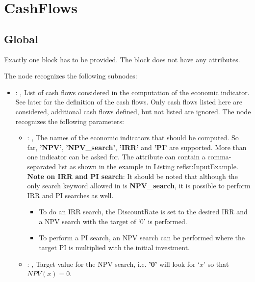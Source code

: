\section{CashFlows}



\subsection{Global}
  Exactly one  block has to be provided. The  block does not have
  any attributes.


  The  node recognizes the following subnodes:
  \begin{itemize}
    \item {}: , 
      List of cash flows considered in the computation of the economic indicator. See later for the
      definition           of the cash flows. Only cash flows listed here are considered, additional
      cash flows defined, but not listed are ignored.
      The  node recognizes the following parameters:
        \begin{itemize}
          \item {}: , 
             The names of the economic indicators that should be computed. So far, \textbf{'NPV'},
            \textbf{'NPV\_search'}, \textbf{'IRR'} and \textbf{'PI'} are supported. More than one
            indicator can be asked for. The  attribute can contain a comma-separated
            list as shown in the example in Listing  ref{lst:InputExample}. \\  \textbf{Note on IRR
            and PI search}: It should be noted that although the only search keyword allowed in
             is \textbf{NPV\_search}, it is possible to perform IRR and PI searches as
            well. \begin{itemize} \item To do an IRR search, the DiscountRate is set to the desired
            IRR and a NPV search with the target of ‘0’ is performed. \item To perform a PI search,
            an NPV search can be performed where the target PI is multiplied with the initial
            investment. \end{itemize}
          \item {}: , 
            Target value for the NPV search, i.e. \textbf{'0'} will look for ‘$x$’ so that $NPV(x) =
            0$.
      \end{itemize}


\end{itemize}
